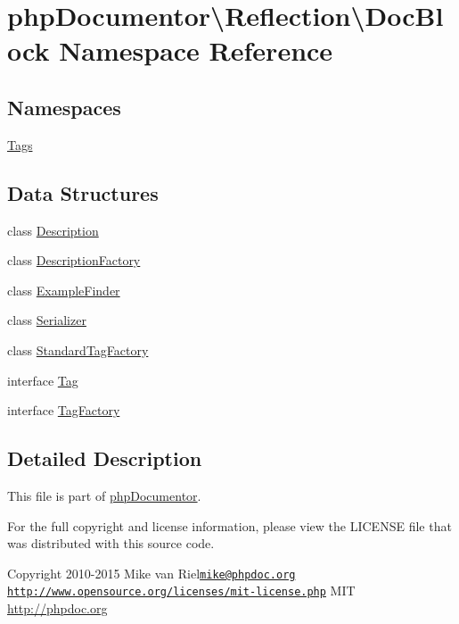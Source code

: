 \hypertarget{namespacephp_documentor_1_1_reflection_1_1_doc_block}{}\section{php\+Documentor\textbackslash{}Reflection\textbackslash{}Doc\+Block Namespace Reference}
\label{namespacephp_documentor_1_1_reflection_1_1_doc_block}
\subsection*{Namespaces}
\begin{DoxyCompactItemize}
\item 
 \mbox{\hyperlink{namespacephp_documentor_1_1_reflection_1_1_doc_block_1_1_tags}{Tags}}
\end{DoxyCompactItemize}
\subsection*{Data Structures}
\begin{DoxyCompactItemize}
\item 
class \mbox{\hyperlink{classphp_documentor_1_1_reflection_1_1_doc_block_1_1_description}{Description}}
\item 
class \mbox{\hyperlink{classphp_documentor_1_1_reflection_1_1_doc_block_1_1_description_factory}{Description\+Factory}}
\item 
class \mbox{\hyperlink{classphp_documentor_1_1_reflection_1_1_doc_block_1_1_example_finder}{Example\+Finder}}
\item 
class \mbox{\hyperlink{classphp_documentor_1_1_reflection_1_1_doc_block_1_1_serializer}{Serializer}}
\item 
class \mbox{\hyperlink{classphp_documentor_1_1_reflection_1_1_doc_block_1_1_standard_tag_factory}{Standard\+Tag\+Factory}}
\item 
interface \mbox{\hyperlink{interfacephp_documentor_1_1_reflection_1_1_doc_block_1_1_tag}{Tag}}
\item 
interface \mbox{\hyperlink{interfacephp_documentor_1_1_reflection_1_1_doc_block_1_1_tag_factory}{Tag\+Factory}}
\end{DoxyCompactItemize}


\subsection{Detailed Description}
This file is part of \mbox{\hyperlink{namespacephp_documentor}{php\+Documentor}}.

For the full copyright and license information, please view the L\+I\+C\+E\+N\+SE file that was distributed with this source code.

\begin{DoxyCopyright}{Copyright}
2010-\/2015 Mike van Riel\href{mailto:mike@phpdoc.org}{\tt mike@phpdoc.\+org}  \href{http://www.opensource.org/licenses/mit-license.php}{\tt http\+://www.\+opensource.\+org/licenses/mit-\/license.\+php} M\+IT \mbox{\hyperlink{}{http\+://phpdoc.\+org}}
\end{DoxyCopyright}
